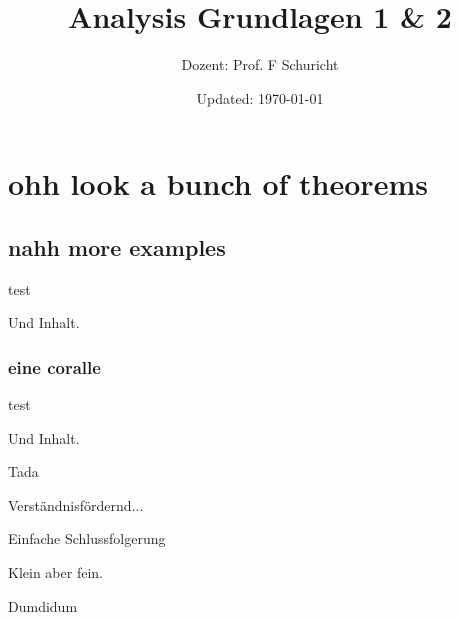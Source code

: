 \documentclass[ngerman,a4paper]{report}
\author{Dozent: Prof. F Schuricht}
\title{Analysis Grundlagen 1 \& 2} %
\date{Updated: \today}
\theoremstyle{break}
\numberwithin{dummy}{section}
\begin{document}
\maketitle
\tableofcontents

\chapter{ohh look a bunch of theorems}

\section{nahh more examples}

\begin{truetheorem}
    test
\end{truetheorem}

\begin{trueproposition}
    Und Inhalt.
\end{trueproposition}

\subsection{eine coralle}
	
\begin{truetheorem}
	test
\end{truetheorem}
	
\begin{trueproposition}
	Und Inhalt.
\end{trueproposition}

\begin{truedefinition}
	Tada
\end{truedefinition}

\begin{trueexample}
	Verständnisfördernd...
\end{trueexample}

\begin{trueconclusion}[Ergänzung]
	Einfache Schlussfolgerung
\end{trueconclusion}

\begin{truelemma}
	Klein aber fein.
\end{truelemma}

\begin{trueremark}[Hossa]
	Dumdidum
\end{trueremark}
\end{document}
